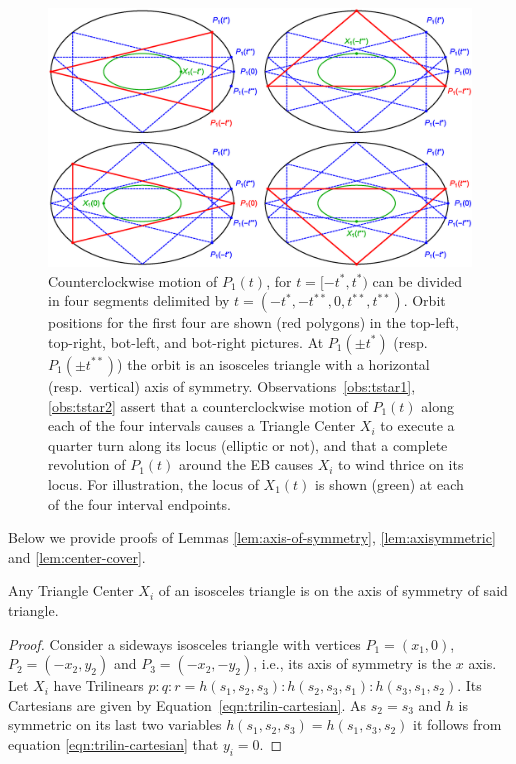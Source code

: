 \begin{figure}
    \centering
    \includegraphics[width=.9\textwidth]{pics_1080_two_isosceles_tstar}
    \caption{Counterclockwise motion of $P_1(t)$, for $t=[-t^*,t^*)$ can be divided in four segments delimited by $t=(-t^*,-t^{**},0,t^{**},t^{**})$. Orbit positions for the first four are shown (red polygons) in the top-left, top-right, bot-left, and bot-right pictures. At $P_1({\pm}t^*)$ (resp.~$P_1({\pm}t^{**})$) the orbit is an isosceles triangle with a horizontal (resp.~vertical) axis of symmetry. Observations~\ref{obs:tstar1},\ref{obs:tstar2} assert that a counterclockwise motion of $P_1(t)$ along each of the four intervals causes a Triangle Center $X_i$ to execute a quarter turn along its locus (elliptic or not), and that a complete revolution of $P_1(t)$ around the EB causes $X_i$ to wind thrice on its locus. For illustration, the locus of $X_1(t)$ is shown (green) at each of the four interval endpoints.}
    \label{fig:triple-winding}
\end{figure}
Below we provide proofs of Lemmas \ref{lem:axis-of-symmetry}, \ref{lem:axisymmetric} and \ref{lem:center-cover}.
\begin{lemma*}[\ref{lem:axis-of-symmetry}]
Any Triangle Center $X_i$ of an isosceles triangle is on the axis of symmetry of said triangle.
\end{lemma*}

\begin{proof} Consider a sideways isosceles triangle with vertices $P_1=(x_1,0)$, $P_2=(-x_2,y_2)$
and $P_3= (-x_2,-y_2)$, i.e., its axis of symmetry is the $x$ axis. Let $X_i$ have Trilinears $p:q:r=h(s_1,s_2,s_3):h(s_2,s_3,s_1):h(s_3,s_1,s_2)$. Its Cartesians are given by Equation~\eqref{eqn:trilin-cartesian}. As $s_2=s_3$ and $h$ is symmetric on its last two variables $h(s_1,s_2,s_3)=h(s_1,s_3,s_2)$ it follows from equation \eqref{eqn:trilin-cartesian} that $y_i=0.$ %
\end{proof}

